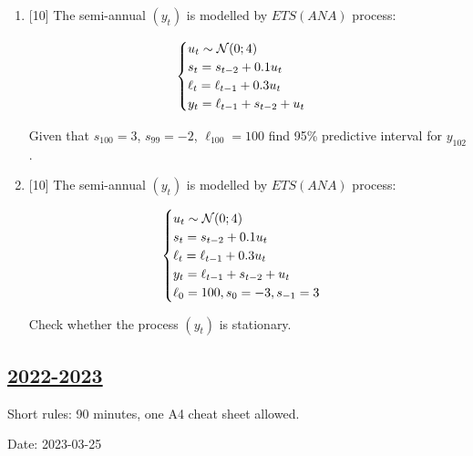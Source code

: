 \begin{enumerate}
\item {[10]} The semi-annual $(y_t)$ is modelled by $ETS(ANA)$ process:

\[
\begin{cases}
    u_t \sim \mathcal{N}(0; 4) \\
    s_t = s_{t-2} + 0.1 u_t \\
    \ell_t = \ell_{t-1} + 0.3 u_t \\
    y_t = \ell_{t-1} + s_{t-2} + u_t \\
\end{cases}    
\]

Given that $s_{100} = 3$, $s_{99} = -2$, $\ell_{100} = 100$ find 95\% predictive interval for $y_{102}$. 


\item {[10]} The semi-annual $(y_t)$ is modelled by $ETS(ANA)$ process:

\[
\begin{cases}
    u_t \sim \mathcal{N}(0; 4) \\
    s_t = s_{t-2} + 0.1 u_t \\
    \ell_t = \ell_{t-1} + 0.3 u_t \\
    y_t = \ell_{t-1} + s_{t-2} + u_t \\
    \ell_0 = 100, s_0 = -3, s_{-1} = 3 \\
\end{cases}    
\]

Check whether the process $(y_t)$ is stationary. 

    

\end{enumerate}



\subsection[2022-2023]{\hyperref[sec:sol_kr_03_2022_2023]{2022-2023}}
\label{sec:kr_03_2022_2023} %

Short rules: 90 minutes, one A4 cheat sheet allowed. 

Date: 2023-03-25

